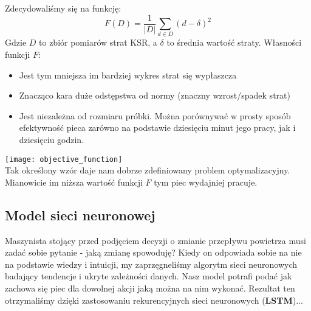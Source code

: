 \documentclass[a4paper]{article}
\begin{document}
Zdecydowaliśmy się na funkcję:
$$F(D)=\frac{1}{|D|}\sum_{d\in D}(d-\delta)^2$$
Gdzie $D$ to zbiór pomiarów strat KSR, a $\delta$ to średnia wartość straty. Własności funkcji $F$:
\begin{itemize}
\item Jest tym mniejsza im bardziej wykres strat się wypłaszcza
\item Znacząco kara duże odstępstwa od normy (znaczny wzrost/spadek strat)
\item Jest niezależna od rozmiaru próbki. Można porównywać w prosty sposób efektywność pieca zarówno na podstawie dziesięciu minut jego pracy, jak i dziesięciu godzin.
\end{itemize}
\texttt{[image: objective\_function]}\\

Tak określony wzór daje nam dobrze zdefiniowany problem optymalizacyjny. Mianowicie im niższa wartość funkcji $F$ tym piec wydajniej pracuje.
\subsection{Model sieci neuronowej}
Maszynista stojący przed podjęciem decyzji o zmianie przepływu powietrza musi zadać sobie pytanie - jaką zmianę spowoduję? Kiedy on odpowiada sobie na nie na podstawie wiedzy i intuicji, my zaprzęgneliśmy algorytm sieci neuronowych badający tendencje i ukryte zależności danych. Nasz model potrafi podać jak zachowa się piec dla dowolnej akcji jaką można na nim wykonać. Rezultat ten otrzymaliśmy dzięki zastosowaniu rekurencyjnych sieci neuronowych (\textbf{LSTM})...

  
\end{document}

